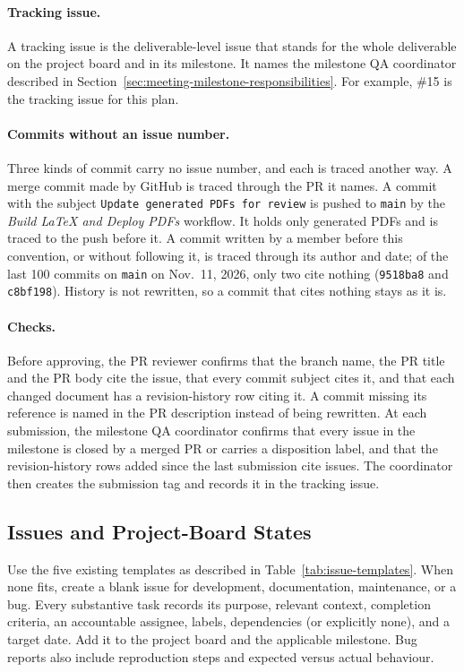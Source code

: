 \documentclass{article}
\begin{document}
\paragraph{Tracking issue.}
A tracking issue is the deliverable-level issue that stands for the whole
deliverable on the project board and in its milestone. It names the milestone
QA coordinator described in
Section~\ref{sec:meeting-milestone-responsibilities}. For example,
\#15 is the tracking issue for this plan.

\paragraph{Commits without an issue number.}
Three kinds of commit carry no issue number, and each is traced another way.
A merge commit made by GitHub is traced through the PR it names. A commit with
the subject \texttt{Update generated PDFs for review} is pushed to
\texttt{main} by the \emph{Build LaTeX and Deploy PDFs} workflow. It holds only
generated PDFs and is traced to the push before it. A commit written by a
member before this convention, or without following it, is traced through its
author and date; of the last 100 commits on \texttt{main} on
Nov.~11, 2026, only two cite nothing (\texttt{9518ba8} and
\texttt{c8bf198}). History is not rewritten, so a commit that cites nothing
stays as it is.

\paragraph{Checks.}
Before approving, the PR reviewer confirms that the branch name, the PR title
and the PR body cite the issue, that every commit subject cites it, and that
each changed document has a revision-history row citing it. A commit missing
its reference is named in the PR description instead of being rewritten. At
each submission, the milestone QA coordinator confirms that every issue in the
milestone is closed by a merged PR or carries a disposition label, and that the
revision-history rows added since the last submission cite issues. The
coordinator then creates the submission tag and records it in the tracking
issue.

\subsection{Issues and Project-Board States}

Use the five existing templates as described in Table~\ref{tab:issue-templates}.
When none fits, create a blank issue for development, documentation,
maintenance, or a bug. Every substantive task records its purpose, relevant
context, completion criteria, an accountable assignee, labels, dependencies
(or explicitly none), and a target date. Add it to the project board and the
applicable milestone. Bug reports also include reproduction steps and
expected versus actual behaviour.
\end{document}
